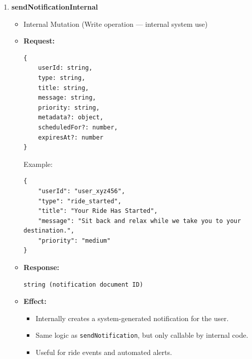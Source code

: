 \documentclass[a4paper,12pt]{article}
\begin{document}
\begin{enumerate}
\item \textbf{sendNotificationInternal}
    \begin{itemize}
        \item Internal Mutation (Write operation — internal system use)
        \item \textbf{Request:}
        \begin{verbatim}
{
    userId: string,
    type: string,
    title: string,
    message: string,
    priority: string,
    metadata?: object,
    scheduledFor?: number,
    expiresAt?: number
}
        \end{verbatim}
        Example:
        \begin{verbatim}
{
    "userId": "user_xyz456",
    "type": "ride_started",
    "title": "Your Ride Has Started",
    "message": "Sit back and relax while we take you to your destination.",
    "priority": "medium"
}
        \end{verbatim}
        \item \textbf{Response:}
        \begin{verbatim}
string (notification document ID)
        \end{verbatim}
        \item \textbf{Effect:}
        \begin{itemize}
            \item Internally creates a system-generated notification for the user.
            \item Same logic as \texttt{sendNotification}, but only callable by internal code.
            \item Useful for ride events and automated alerts.
        \end{itemize}
    \end{itemize}


\end{enumerate}
\end{document}
